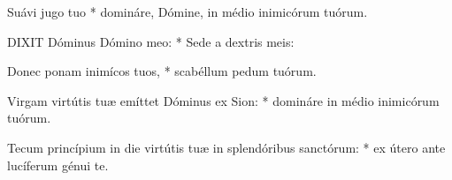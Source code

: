 


 Suávi jugo tuo * domináre, Dómine, in médio inimicórum tuórum.


\lettrine[lines=2]{D}{IXIT} Dóminus Dómino meo: * Sede a dextris meis:

Donec ponam inimícos tuos, * scabéllum pedum tuórum.

Virgam virtútis tuæ emíttet Dóminus ex Sion: * domináre in médio inimicórum tuórum.

Tecum princípium in die virtútis tuæ in splendóribus sanctórum: * ex útero ante lucíferum génui te.

